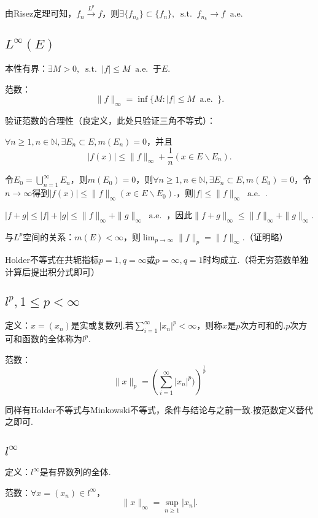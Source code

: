 \documentclass[bwprint, withoutpreface]{cumcmthesis}
\newcommand*{\st}{\mathop{}\!\mathrm{s.t.}\!\mathop{}}
\newcommand*{\aev}{\mathop{}\!\mathrm{a.e.}\!\mathop{}}
\newcommand*{\nnorm}[2]{\| #1 \|_{#2}}
\begin{document}
由Risez定理可知，$f_n \stackrel{L^p}{\longrightarrow} f$，则$\exists \{f_{n_k}\} \subset \{f_n\}, \st f_{n_k} \to f \aev$

\subsection{$L^{\infty}(E)$}
本性有界：$\exists M > 0, \st |f| \leqslant M \aev \mbox{于}E$.

范数：\[\nnorm{f}{\infty} = \inf\{M:|f| \leqslant M \aev\}.\]

验证范数的合理性（良定义，此处只验证三角不等式）：

$\forall n \geqslant 1, n \in \mathbb{N}, \exists E_n \subset E, m(E_n) = 0$，并且\[|f(x)| \leqslant \nnorm{f}{\infty} + \frac{1}{n} (x \in E \backslash E_n).\]

令$E_0 = \bigcup_{n = 1}^{\infty}{E_n}$，则$m(E_0) = 0$，则$\forall n \geqslant 1, n \in \mathbb{N}, \exists E_n \subset E, m(E_0) = 0$，令$n \to \infty$得到$|f(x)| \leqslant \nnorm{f}{\infty}(x \in E \backslash E_0).$，则$|f| \leqslant \nnorm{f}{\infty} \aev$.

$|f + g| \leqslant |f| + |g| \leqslant \nnorm{f}{\infty} + \nnorm{g}{\infty} \aev$，因此$\nnorm{f + g}{\infty} \leqslant \nnorm{f}{\infty} + \nnorm{g}{\infty}$.

与$L^p$空间的关系：$m(E) < \infty$，则$\lim_{p \to \infty}\nnorm{f}{p} = \nnorm{f}{\infty}$.（证明略）

Holder不等式在共轭指标$p = 1, q = \infty$或$p = \infty, q = 1$时均成立.（将无穷范数单独计算后提出积分式即可）

\subsection{$l^p, 1 \leqslant p < \infty$}
定义：$x = (x_n)$是实或复数列.若$\sum_{i = 1}^{\infty}{|x_n|^p} < \infty$，则称$x$是$p$次方可和的.$p$次方可和函数的全体称为$l^p$.

范数：\[\nnorm{x}{p} = (\sum_{i = 1}^{\infty}{|x_n|^p)})^\frac{1}{p}\]

同样有Holder不等式与Minkowski不等式，条件与结论与之前一致.按范数定义替代之即可.

\subsection{$l^{\infty}$}
定义：$l^{\infty}$是有界数列的全体.

范数：$\forall x = (x_n) \in l^{\infty}$，\[\nnorm{x}{\infty} = \sup_{n \geqslant 1}{|x_n|}.\]
\end{document}
